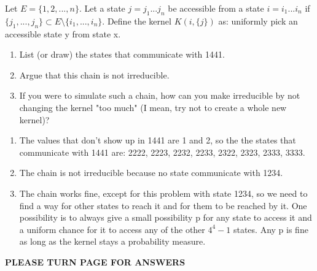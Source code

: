 \begin{Exercise}
Let $E = \{1, 2, ..., n\}$. Let a state $j = j_1...j_n$ be accessible from a state $i = i_1...i_n$ if $\{j_1, ..., j_n\} \subset E \setminus \{i_1, ..., i_n\} $. Define the kernel $K(i, \{j\})$ as: uniformly pick an accessible state y from state x. 
\begin{enumerate}[label=(\alph*)]
\item List (or draw) the states that communicate with 1441.
\item Argue that this chain is not irreducible.
\item If you were to simulate such a chain, how can you make irreducible by not changing the kernel "too much" (I mean, try not to create a whole new kernel)?
\end{enumerate}
\end{Exercise}
\begin{Answer}
\begin{enumerate}[label=(\alph*)]
\item The values that don't show up in 1441 are 1 and 2, so the the states that communicate with 1441 are: 2222, 2223, 2232, 2233, 2322, 2323, 2333, 3333.
\item The chain is not irreducible because no state communicate with 1234.
\item The chain works fine, except for this problem with state 1234, so we need to find a way for other states to reach it and for them to be reached by it. One possibility is to always give a small possibility p for any state to access it and a uniform chance for it to access any of the other $4^4-1$ states. Any p is fine as long as the kernel stays a probability measure.
\end{enumerate}
\end{Answer}

\textbf{\uppercase{PLEASE TURN PAGE FOR ANSWERS}}



\clearpage
\shipoutAnswer

